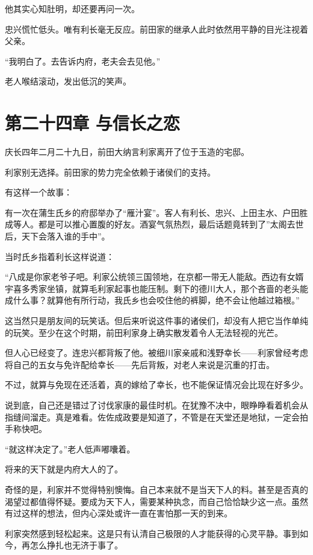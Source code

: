 \documentclass[
]{book}
\begin{document}
他其实心知肚明，却还要再问一次。

忠兴慌忙低头。唯有利长毫无反应。前田家的继承人此时依然用平静的目光注视着父亲。

``我明白了。去告诉内府，老夫会去见他。''

老人喉结滚动，发出低沉的笑声。

\chapter*{第二十四章 与信长之恋}\label{ux7b2cux4e8cux5341ux56dbux7ae0-ux4e0eux4fe1ux957fux4e4bux604b}

庆长四年二月二十九日，前田大纳言利家离开了位于玉造的宅邸。

利家别无选择。前田家的势力完全依赖于诸侯们的支持。

有这样一个故事：

有一次在蒲生氏乡的府邸举办了``雁汁宴''。客人有利长、忠兴、上田主水、户田胜成等人。都是可以推心置腹的好友。酒宴气氛热烈，最后话题竟转到了''太阁去世后，天下会落入谁的手中''。

当时氏乡指着利长这样说道：

``八成是你家老爷子吧。利家公统领三国领地，在京都一带无人能敌。西边有女婿宇喜多秀家坐镇，就算毛利家起事也能压制。剩下的德川大人，那个吝啬的老头能成什么事？就算他有所行动，我氏乡也会咬住他的裤脚，绝不会让他越过箱根。''

这当然只是朋友间的玩笑话。但后来听说这件事的诸侯们，却没有人把它当作单纯的玩笑。至少在这个时期，前田利家身上确实散发着令人无法轻视的光芒。

但人心已经变了。连忠兴都背叛了他。被细川家亲戚和浅野幸长------利家曾经考虑将自己的五女与免许配给幸长------先后背叛，对老人来说是沉重的打击。

不过，就算与免现在还活着，真的嫁给了幸长，也不能保证情况会比现在好多少。

说到底，自己还是错过了讨伐家康的最佳时机。在犹豫不决中，眼睁睁看着机会从指缝间溜走。真是难看。佐佐成政要是知道了，不管是在天堂还是地狱，一定会拍手称快吧。

``就这样决定了。''老人低声嘟囔着。

将来的天下就是内府大人的了。

奇怪的是，利家并不觉得特别懊悔。自己本来就不是当天下人的料。甚至是否真的渴望过都值得怀疑。要成为天下人，需要某种执念，而自己恰恰缺少这一点。虽然有过这样的想法，但内心深处或许一直在害怕那一天的到来。

利家突然感到轻松起来。这是只有认清自己极限的人才能获得的心灵平静。事到如今，再怎么挣扎也无济于事了。
\end{document}
